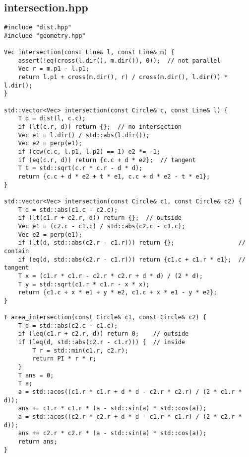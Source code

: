\subsection{intersection.hpp}

\begin{small}
\begin{markdown}

\end{markdown}
\end{small}

\begin{lstlisting}
#include "dist.hpp"
#include "geometry.hpp"

Vec intersection(const Line& l, const Line& m) {
    assert(!eq(cross(l.dir(), m.dir()), 0));  // not parallel
    Vec r = m.p1 - l.p1;
    return l.p1 + cross(m.dir(), r) / cross(m.dir(), l.dir()) * l.dir();
}

std::vector<Vec> intersection(const Circle& c, const Line& l) {
    T d = dist(l, c.c);
    if (lt(c.r, d)) return {};  // no intersection
    Vec e1 = l.dir() / std::abs(l.dir());
    Vec e2 = perp(e1);
    if (ccw(c.c, l.p1, l.p2) == 1) e2 *= -1;
    if (eq(c.r, d)) return {c.c + d * e2};  // tangent
    T t = std::sqrt(c.r * c.r - d * d);
    return {c.c + d * e2 + t * e1, c.c + d * e2 - t * e1};
}

std::vector<Vec> intersection(const Circle& c1, const Circle& c2) {
    T d = std::abs(c1.c - c2.c);
    if (lt(c1.r + c2.r, d)) return {};  // outside
    Vec e1 = (c2.c - c1.c) / std::abs(c2.c - c1.c);
    Vec e2 = perp(e1);
    if (lt(d, std::abs(c2.r - c1.r))) return {};                  // contain
    if (eq(d, std::abs(c2.r - c1.r))) return {c1.c + c1.r * e1};  // tangent
    T x = (c1.r * c1.r - c2.r * c2.r + d * d) / (2 * d);
    T y = std::sqrt(c1.r * c1.r - x * x);
    return {c1.c + x * e1 + y * e2, c1.c + x * e1 - y * e2};
}

T area_intersection(const Circle& c1, const Circle& c2) {
    T d = std::abs(c2.c - c1.c);
    if (leq(c1.r + c2.r, d)) return 0;    // outside
    if (leq(d, std::abs(c2.r - c1.r))) {  // inside
        T r = std::min(c1.r, c2.r);
        return PI * r * r;
    }
    T ans = 0;
    T a;
    a = std::acos((c1.r * c1.r + d * d - c2.r * c2.r) / (2 * c1.r * d));
    ans += c1.r * c1.r * (a - std::sin(a) * std::cos(a));
    a = std::acos((c2.r * c2.r + d * d - c1.r * c1.r) / (2 * c2.r * d));
    ans += c2.r * c2.r * (a - std::sin(a) * std::cos(a));
    return ans;
}

\end{lstlisting}

